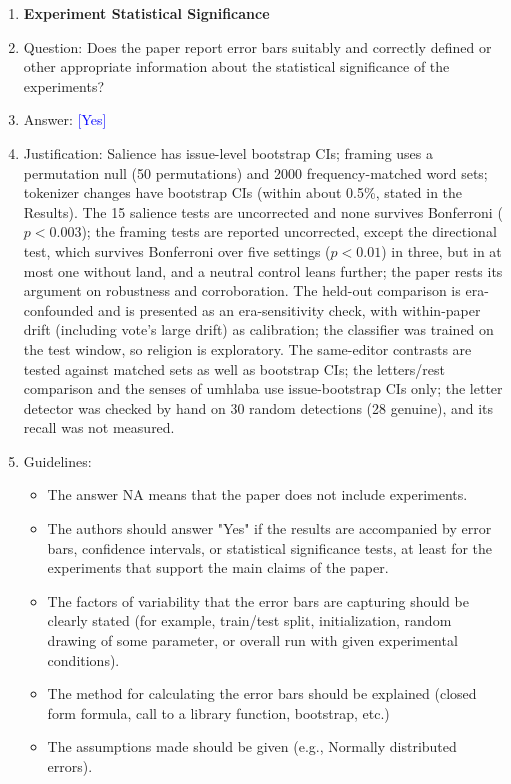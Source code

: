 \documentclass[10pt,letterpaper]{article}
\newcommand{\answerYes}[1][]{\textcolor{blue}{[Yes] #1}}
\begin{document}
\begin{enumerate}
\item {\bf Experiment Statistical Significance}
    \item[] Question: Does the paper report error bars suitably and correctly defined or other appropriate information about the statistical significance of the experiments?
    \item[] Answer: \answerYes{}
    \item[] Justification: Salience has issue-level bootstrap CIs; framing uses a permutation null (50 permutations) and 2000 frequency-matched word sets; tokenizer changes have bootstrap CIs (within about 0.5\%, stated in the Results). The 15 salience tests are uncorrected and none survives Bonferroni ($p<0.003$); the framing tests are reported uncorrected, except the directional test, which survives Bonferroni over five settings ($p<0.01$) in three, but in at most one without land, and a neutral control leans further; the paper rests its argument on robustness and corroboration. The held-out comparison is era-confounded and is presented as an era-sensitivity check, with within-paper drift (including vote's large drift) as calibration; the classifier was trained on the test window, so religion is exploratory. The same-editor contrasts are tested against matched sets as well as bootstrap CIs; the letters/rest comparison and the senses of umhlaba use issue-bootstrap CIs only; the letter detector was checked by hand on 30 random detections (28 genuine), and its recall was not measured.
    \item[] Guidelines:
    \begin{itemize}
        \item The answer NA means that the paper does not include experiments.
        \item The authors should answer "Yes" if the results are accompanied by error bars, confidence intervals, or statistical significance tests, at least for the experiments that support the main claims of the paper.
        \item The factors of variability that the error bars are capturing should be clearly stated (for example, train/test split, initialization, random drawing of some parameter, or overall run with given experimental conditions).
        \item The method for calculating the error bars should be explained (closed form formula, call to a library function, bootstrap, etc.)
        \item The assumptions made should be given (e.g., Normally distributed errors).

\end{itemize}
\end{enumerate}
\end{document}
